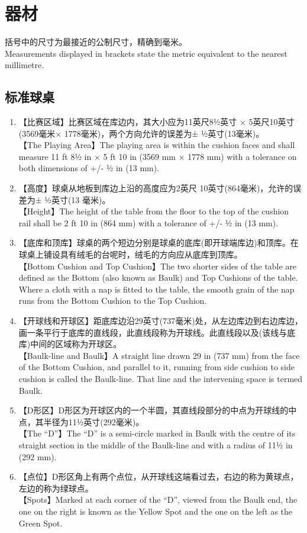 \section{器材}\label{221}

\noindent 括号中的尺寸为最接近的公制尺寸，精确到毫米。\\
Measurements displayed in brackets state the metric equivalent to the nearest millimetre.

\subsection{标准球桌}\label{2211}

\begin{enumerate}[label=(\alph*)]
    \item 【比赛区域】比赛区域在库边内，其大小应为11英尺8½英寸 × 5英尺10英寸(3569毫米× 1778毫米)，两个方向允许的误差为± ½英寸(13毫米)。\\
    【The Playing Area】The playing area is within the cushion faces and shall measure 11 ft 8½ in × 5 ft 10 in (3569 mm × 1778 mm) with a tolerance on both dimensions of +/- ½ in (13 mm).
    \item 【高度】球桌从地板到库边上沿的高度应为2英尺 10英寸(864毫米)，允许的误差为± ½英寸(13 毫米)。\\
    【Height】The height of the table from the floor to the top of the cushion rail shall be 2 ft 10 in (864 mm) with a tolerance of +/- ½ in (13 mm).
    \item 【底库和顶库】球桌的两个短边分别是球桌的底库(即开球端库边)和顶库。在球桌上铺设具有绒毛的台呢时，绒毛的方向应从底库到顶库。\\
    【Bottom Cushion and Top Cushion】The two shorter sides of the table are defined as the Bottom (also known as Baulk) and Top Cushions of the table. Where a cloth with a nap is fitted to the table, the smooth grain of the nap runs from the Bottom Cushion to the Top Cushion.
    \item 【开球线和开球区】距底库边沿29英寸(737毫米)处，从左边库边到右边库边，画一条平行于底库的直线段，此直线段称为开球线。此直线段以及(该线与底库)中间的区域称为开球区。\\
    【Baulk-line and Baulk】A straight line drawn 29 in (737 mm) from the face of the Bottom Cushion, and parallel to it, running from side cushion to side cushion is called the Baulk-line. That line and the intervening space is termed Baulk.
    \item 【D形区】D形区为开球区内的一个半圆，其直线段部分的中点为开球线的中点，其半径为11½英寸(292毫米)。\\
    【The ``D''】The ``D'' is a semi-circle marked in Baulk with the centre of its straight section in the middle of the Baulk-line and with a 
    radius of 11½ in (292 mm).
    \item \label{2211f}【点位】D形区角上有两个点位，从开球线这端看过去，右边的称为黄球点，左边的称为绿球点。\\
    【Spots】Marked at each corner of the ``D'', viewed from the Baulk end, the one on the right is known as the Yellow Spot and the one on the left as the Green Spot.


\end{enumerate}
